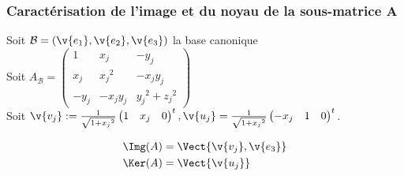 \subsubsection{Caractérisation de l'image et du noyau de la sous-matrice A}
Soit $\mathcal B = (\v{e_1},\v{e_2},\v{e_3})$ la base canonique\\
Soit $A_\mathcal{B} = \begin{pmatrix}
 1 & {x_j} & -{y_j} \\
 {x_j} & {x_j}^2 & -{x_jy_j} \\
 -{y_j} & -{x_jy_j} & {y_j}^2 + {z_j}^2
\end{pmatrix}$\\
Soit ${\v{v_j}} := \frac{1}{\sqrt{1 + {x_j}^2}}\begin{pmatrix} 1&{x_j}&0\end{pmatrix}^t, {\v{u_j}} = \frac{1}{\sqrt{1+{x_j}^2}}\begin{pmatrix} -{x_j} & 1 & 0 \end{pmatrix}^t$.
\begin{prop}
  \begin{align*}
    \Img(A) &= \Vect{{\v{v_j}},\v{e_3}}\\
    \Ker(A) &= \Vect {\v{u_j}}
  \end{align*}
\end{prop}

